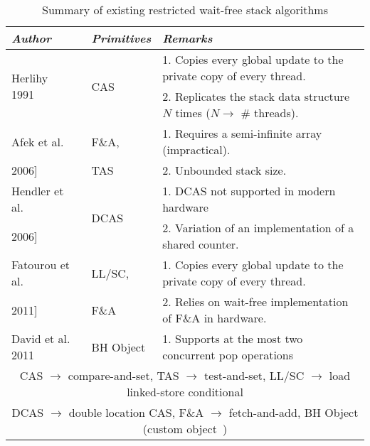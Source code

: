 \documentclass{llncs}
\begin{document}
\begin{table*}[!htb]
\scriptsize
\begin{center}

\begin{tabular}{|l|l|l| }
\hline
                                                         
{\em Author}			&{\em Primitives}	&{\em Remarks}\\\hline 

  
\hline  
\multirow{2}{*}{Herlihy 1991~\cite{oldUniversal}}		&\multirow{2}{*}{CAS}	&1. Copies every global update to the
private copy of every thread.
\\
	&							&2. Replicates the stack data structure $N$ times ($N \rightarrow$ \# threads).
\\\hline

Afek et al.~\cite{arrayBased}  	&F\&A,	 		&1. Requires a semi-infinite array (impractical).
\\  
2006]				&TAS			&2. Unbounded stack size.
\\\hline 

Hendler et al.~\cite{WaitFreeSharedCounter1}	&\multirow{2}{*}{DCAS}	&1. DCAS not supported in modern hardware 
\\  
2006]						&			& 2. Variation of an implementation of a shared counter. 
\\\hline 


Fatourou et al.~\cite{newUniversal}	&LL/SC,	&1. Copies every global update to the private copy of every thread. \\
2011]			&F\&A	&2. Relies on wait-free implementation of F\&A in hardware.
\\\hline 
David et al. 2011 ~\cite{restrictedStack}		&BH Object		&1. Supports at the most two concurrent pop operations
\\\hline      
\hline
\multicolumn{3}{||c||}{CAS $\rightarrow$ compare-and-set, TAS $\rightarrow$ test-and-set, LL/SC $\rightarrow$
load linked-store conditional} \\
\multicolumn{3}{||c||}{DCAS $\rightarrow$ double location CAS, F\&A $\rightarrow$ fetch-and-add, BH Object (custom
object~\cite{restrictedStack})} \\
\hline
\end{tabular}
\caption{ Summary of existing restricted wait-free stack algorithms  \label{tab:rel}}
\end{center}

\vskip -3mm
\end{table*}
\end{document}
